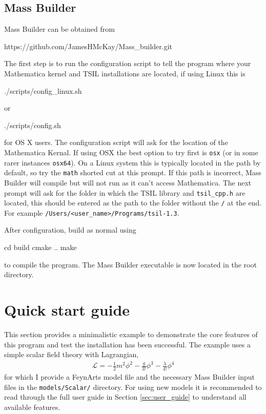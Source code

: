 \subsection{Mass Builder}
Mass Builder can be obtained from

\begin{lstterm}
https://github.com/JamesHMcKay/Mass_builder.git
\end{lstterm}

The first step is to run the configuration script to tell the program where your Mathematica kernel and TSIL installations are located, if using Linux this is
\begin{lstterm}
./scripts/config_linux.sh
\end{lstterm}
or
\begin{lstterm}
./scripts/config.sh
\end{lstterm}
for OS X users.  The configuration script will ask for the location of the Mathematica Kernal.  If using OSX the best option to try first is \lstinline{osx} (or in some rarer instances \lstinline{osx64}).  On a Linux system this is typically located in the path by default, so try the \lstinline{math} shorted cut at this prompt.  If this path is incorrect, Mass Builder will compile but will not run as it can't access Mathematica.  The next prompt will ask for the folder in which the TSIL library and \lstinline{tsil_cpp.h} are located, this should be entered as the path to the folder without the \lstinline{/} at the end.  For example \lstinline{/Users/<user_name>/Programs/tsil-1.3}.

After configuration, build as normal using
\begin{lstterm}
cd build
cmake ..
make
\end{lstterm}
to compile the program.  The Mass Builder executable is now located in the root directory.

\section{Quick start guide}

This section provides a minimalistic example to demonstrate the core features of this program and test the installation has been successful.  The example uses a simple scalar field theory with Lagrangian,
\begin{align}
\mathcal{L} = -\frac{1}{2}m^2\phi^2 - \frac{g}{3!}\phi^3-\frac{\lambda}{4!}\phi^4
\end{align}
for which I provide a FeynArts model file and the necessary Mass Builder input files in the \lstinline{models/Scalar/} directory.  For using new models it is recommended to read through the full user guide in Section \ref{sec:user_guide} to understand all available features.

